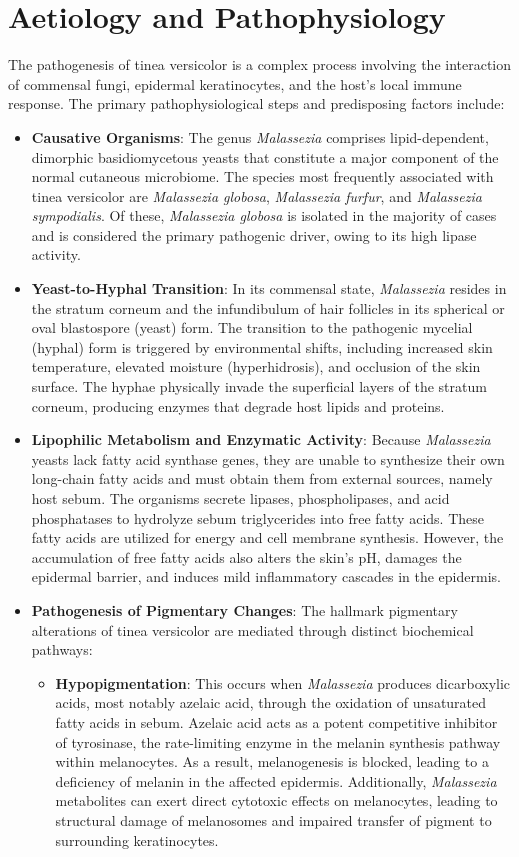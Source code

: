 \section*{Aetiology and Pathophysiology}
The pathogenesis of tinea versicolor is a complex process involving the interaction of commensal fungi, epidermal keratinocytes, and the host's local immune response. The primary pathophysiological steps and predisposing factors include:

\begin{itemize}
    \item \textbf{Causative Organisms}: The genus \textit{Malassezia} comprises lipid-dependent, dimorphic basidiomycetous yeasts that constitute a major component of the normal cutaneous microbiome. The species most frequently associated with tinea versicolor are \textit{Malassezia globosa}, \textit{Malassezia furfur}, and \textit{Malassezia sympodialis}. Of these, \textit{Malassezia globosa} is isolated in the majority of cases and is considered the primary pathogenic driver, owing to its high lipase activity.
    \item \textbf{Yeast-to-Hyphal Transition}: In its commensal state, \textit{Malassezia} resides in the stratum corneum and the infundibulum of hair follicles in its spherical or oval blastospore (yeast) form. The transition to the pathogenic mycelial (hyphal) form is triggered by environmental shifts, including increased skin temperature, elevated moisture (hyperhidrosis), and occlusion of the skin surface. The hyphae physically invade the superficial layers of the stratum corneum, producing enzymes that degrade host lipids and proteins.
    \item \textbf{Lipophilic Metabolism and Enzymatic Activity}: Because \textit{Malassezia} yeasts lack fatty acid synthase genes, they are unable to synthesize their own long-chain fatty acids and must obtain them from external sources, namely host sebum. The organisms secrete lipases, phospholipases, and acid phosphatases to hydrolyze sebum triglycerides into free fatty acids. These fatty acids are utilized for energy and cell membrane synthesis. However, the accumulation of free fatty acids also alters the skin's pH, damages the epidermal barrier, and induces mild inflammatory cascades in the epidermis.
    \item \textbf{Pathogenesis of Pigmentary Changes}: The hallmark pigmentary alterations of tinea versicolor are mediated through distinct biochemical pathways:
    \begin{itemize}
        \item \textbf{Hypopigmentation}: This occurs when \textit{Malassezia} produces dicarboxylic acids, most notably azelaic acid, through the oxidation of unsaturated fatty acids in sebum. Azelaic acid acts as a potent competitive inhibitor of tyrosinase, the rate-limiting enzyme in the melanin synthesis pathway within melanocytes. As a result, melanogenesis is blocked, leading to a deficiency of melanin in the affected epidermis. Additionally, \textit{Malassezia} metabolites can exert direct cytotoxic effects on melanocytes, leading to structural damage of melanosomes and impaired transfer of pigment to surrounding keratinocytes.

\end{itemize}
\end{itemize}
